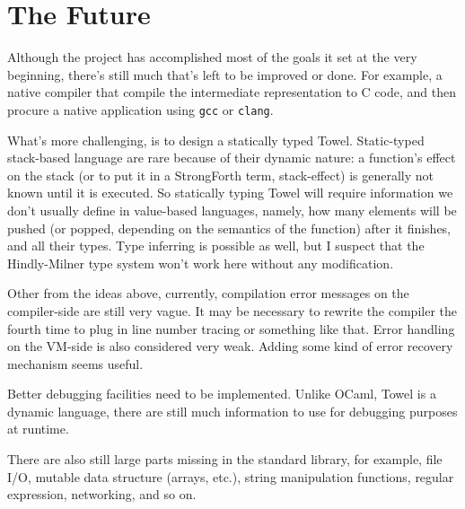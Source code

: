 \documentclass{report}
\begin{document}
\part{The Future}

Although the project has accomplished most of the goals it set at the very beginning, there's still much that's left to be improved or done. For example, a native compiler that compile the intermediate representation to C code, and then procure a native application using \texttt{gcc} or \texttt{clang}.

What's more challenging, is to design a statically typed Towel. Static-typed stack-based language are rare because of their dynamic nature: a function's effect on the stack (or to put it in a StrongForth term, stack-effect) is generally not known until it is executed. So statically typing Towel will require information we don't usually define in value-based languages, namely, how many elements will be pushed (or popped, depending on the semantics of the function) after it finishes, and all their types. Type inferring is possible as well, but I suspect that the Hindly-Milner type system won't work here without any modification.

Other from the ideas above, currently, compilation error messages on the compiler-side are still very vague. It may be necessary to rewrite the compiler the fourth time to plug in line number tracing or something like that. Error handling on the VM-side is also considered very weak. Adding some kind of error recovery mechanism seems useful.

Better debugging facilities need to be implemented. Unlike OCaml, Towel is a dynamic language, there are still much information to use for debugging purposes at runtime.

There are also still large parts missing in the standard library, for example, file I/O, mutable data structure (arrays, etc.), string manipulation functions, regular expression, networking, and so on.
\end{document}
